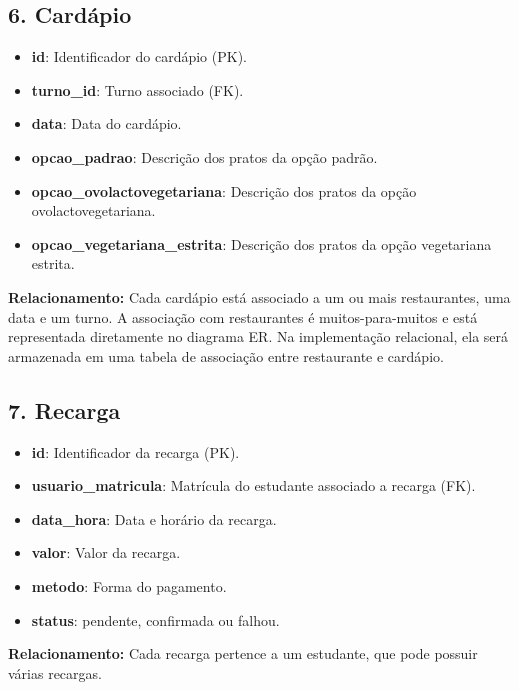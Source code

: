 \documentclass[a4paper,12pt]{article}
\begin{document}
\subsection*{6. Cardápio}
\begin{itemize}
    \item \textbf{id}: Identificador do cardápio (PK).
    \item \textbf{turno\_id}: Turno associado (FK).
    \item \textbf{data}: Data do cardápio.
    \item \textbf{opcao\_padrao}: Descrição dos pratos da opção padrão.
    \item \textbf{opcao\_ovolactovegetariana}: Descrição dos pratos da opção ovolactovegetariana.
    \item \textbf{opcao\_vegetariana\_estrita}: Descrição dos pratos da opção vegetariana estrita.
\end{itemize}
\noindent\textbf{Relacionamento:} Cada cardápio está associado a um ou mais restaurantes, 
uma data e um turno. A associação com restaurantes é muitos-para-muitos e está
representada diretamente no diagrama ER. Na implementação relacional, ela será
armazenada em uma tabela de associação entre restaurante e cardápio.

\subsection*{7. Recarga}
\begin{itemize}
    \item \textbf{id}: Identificador da recarga (PK).
    \item \textbf{usuario\_matricula}: Matrícula do estudante associado a recarga (FK).
    \item \textbf{data\_hora}: Data e horário da recarga.
    \item \textbf{valor}: Valor da recarga.
    \item \textbf{metodo}: Forma do pagamento.
    \item \textbf{status}: pendente, confirmada ou falhou.
\end{itemize}
\noindent\textbf{Relacionamento:} Cada recarga pertence a um estudante, 
que pode possuir várias recargas. 

\clearpage
\end{document}
